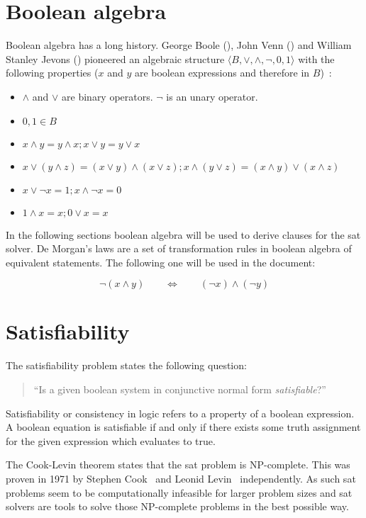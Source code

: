 \section{Boolean algebra}
\label{sec:boole}
%
Boolean algebra has a long history. George Boole (), John Venn () and William Stanley Jevons () pioneered an algebraic structure $\langle B, \lor, \land, \neg, 0, 1\rangle$ with the following properties ($x$ and $y$ are boolean expressions and therefore in $B$)~\cite[10]{Sat20}:
%
\begin{itemize}
  \item $\land$ and $\lor$ are binary operators. $\neg$ is an unary operator.
  \item $0, 1 \in B$
  \item $x \land y = y \land x; x \lor y = y \lor x$
  \item $x \lor (y \land z) = (x \lor y) \land (x \lor z); x \land (y \lor z) = (x \land y) \lor (x \land z)$
  \item $x \lor \neg x = 1; x \land \neg x = 0$
  \item $1 \land x = x; 0 \lor x = x$
\end{itemize}

In the following sections boolean algebra will be used to derive clauses for the \gls{sat} solver. De Morgan's laws are a set of transformation rules in boolean algebra of equivalent statements. The following one will be used in the document:

\[
  \neg (x \land y) \qquad\Leftrightarrow\qquad (\neg x) \land (\neg y)
\]

\section{Satisfiability}
\label{sec:sat}
%
The satisfiability problem states the following question:
\begin{quote}
  ``Is a given boolean system in conjunctive normal form \emph{satisfiable}?''
\end{quote}
%
Satisfiability or consistency in logic refers to a property of a boolean expression. A boolean equation is satisfiable if and only if there exists some truth assignment for the given expression which evaluates to true.

The Cook-Levin theorem states that the \gls{sat} problem is NP-complete. This was proven in 1971 by Stephen Cook~\cite{Sat01} and Leonid Levin~\cite{Sat02} independently. As such \gls{sat} problems seem to be computationally infeasible for larger problem sizes and \gls{sat} solvers are tools to solve those NP-complete problems in the best possible way.

